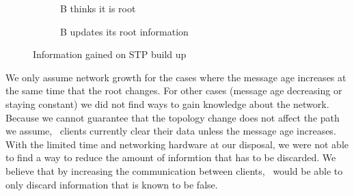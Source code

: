 \begin{figure}[h]
    \begin{centering}
        \begin{subfigure}[b]{0.4\textwidth}
            \centering
            \caption{B thinks it is root}
            \label{fig:build_up1}
        \end{subfigure}
        \hspace{1cm}
        \begin{subfigure}[b]{0.4\textwidth}
            \centering
            \caption{B updates its root information}
            \label{fig:build_up2}
        \end{subfigure}
    \end{centering}
    \caption{Information gained on STP build up}
    \label{fig:build_up}
\end{figure}

We only assume network growth for the cases where the message age increases at the same time that the root changes.
For other cases (message age decreasing or staying constant) we did not find ways to gain knowledge about the network.
Because we cannot guarantee that the topology change does not affect the path we assume, \tool\ clients currently clear their data unless the message age increases.
With the limited time and networking hardware at our disposal, we were not able to find a way to reduce the amount of informtion that has to be discarded.
We believe that by increasing the communication between clients, \tool\ would be able to only discard information that is known to be false.

